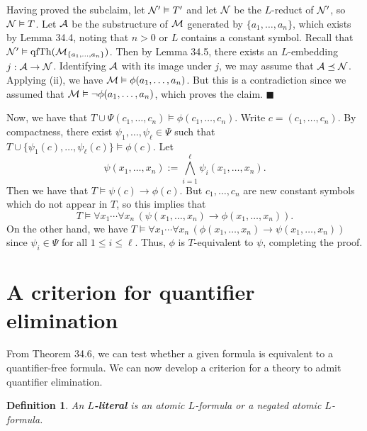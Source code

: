 \documentclass[10pt]{article}
\makeatletter
\DeclareMathOperator{\qfTh}{qfTh}
\theoremstyle{newstyle}
\newtheorem{defn}[thm]{Definition}
\newenvironment{pf}[1][\proofname]{\par
  \pushQED{\qed}%
  \normalfont \topsep0\p@\relax
  \trivlist
  \item[\hskip\labelsep\scshape
  #1\@addpunct{.}]\ignorespaces
}{%
  \popQED\endtrivlist\@endpefalse
}
\makeatother
\begin{document}
\begin{pf}
Having proved the subclaim, let ${\cal N}' \vDash T'$ and let ${\cal N}$ be the $L$-reduct of 
${\cal N}'$, so ${\cal N} \vDash T$. Let ${\cal A}$ be the substructure of ${\cal M}$ 
generated by $\{a_1, \dots, a_n\}$, which exists by Lemma 34.4, noting that $n > 0$ or 
$L$ contains a constant symbol. Recall that ${\cal N}' \vDash \qfTh({\cal M}_{\{a_1, \dots, 
a_n\}})$. Then by Lemma 34.5, there exists an $L$-embedding $j : {\cal A} \to {\cal N}$. 
Identifying ${\cal A}$ with its image under $j$, we may assume that ${\cal A} \preceq {\cal N}$. 
Applying (ii), we have ${\cal M} \vDash \phi(a_1, \dots, a_n)$. But this is a contradiction 
since we assumed that ${\cal M} \vDash \neg \phi(a_1, \dots, a_n)$, which proves the claim. 
\hfill $\blacksquare$

Now, we have that $T \cup \Psi(c_1, \dots, c_n) \vDash \phi(c_1, \dots, c_n)$. 
Write $c = (c_1, \dots, c_n)$.
By compactness, there exist $\psi_1, \dots, \psi_\ell \in \Psi$ such that 
$T \cup \{\psi_1(c), \dots, \psi_\ell(c)\} \vDash \phi(c)$. Let 
\[ \psi(x_1, \dots, x_n) := \bigwedge_{i=1}^\ell \psi_i(x_1, \dots, x_n). \] 
Then we have that $T \vDash \psi(c) \to \phi(c)$. But $c_1, \dots, c_n$ are new 
constant symbols which do not appear in $T$, so this implies that 
\[ T \vDash \forall x_1 \cdots \forall x_n \, (\psi(x_1, \dots, x_n) \to \phi(x_1, 
\dots, x_n)). \] 
On the other hand, we have $T \vDash \forall x_1 \cdots \forall x_n \, 
(\phi(x_1, \dots, x_n) \to \psi(x_1, \dots, x_n))$ since 
$\psi_i \in \Psi$ for all $1 \leq i \leq \ell$. 
Thus, $\phi$ is $T$-equivalent to $\psi$, completing the proof.
\end{pf}

\newpage
\section{A criterion for quantifier elimination}

From Theorem 34.6, we can test whether a given formula is equivalent to 
a quantifier-free formula. We can now develop a criterion for a theory to admit quantifier 
elimination. 

\begin{defn}
An {\bf $L$-literal} is an atomic $L$-formula or a negated atomic $L$-formula. 
\end{defn}
\end{document}
